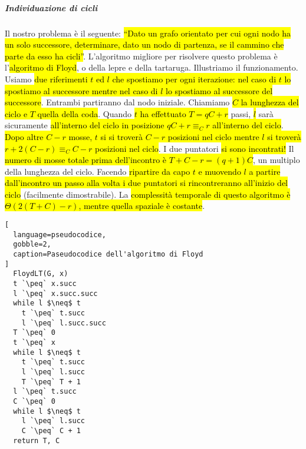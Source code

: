 \documentclass[a4paper,11pt,twoside]{article}
\theoremstyle{plain}
\theoremstyle{definition}
\theoremstyle{remark}
\newcommand{\peq}{$\gets$}
\begin{document}
\subparagraph{Individuazione di cicli} Il nostro problema è il seguente:
\hl{``Dato un grafo orientato per cui ogni nodo ha un solo successore,
determinare, dato un nodo di partenza, se il cammino che parte da esso ha
cicli''}. L'algoritmo migliore per risolvere questo problema è l'\hl{algoritmo
di Floyd}, o della lepre e della tartaruga. Illustriamo il funzionamento. Usiamo
\hl{due riferimenti $t$ ed $l$ che spostiamo per ogni iterazione: nel caso di
$t$ lo spostiamo al successore mentre nel caso di $l$ lo spostiamo al successore
del successore}. Entrambi partiranno dal nodo iniziale. Chiamiamo \hl{$C$ la
lunghezza del ciclo e $T$ quella della coda}. Quando \hl{$t$ ha effettuato $T =
qC + r$} passi, \hl{$l$} sarà sicuramente \hl{all'interno del ciclo in posizione
$qC + r \equiv_C r$ all'interno del ciclo}. \hl{Dopo altre $C-r$ mosse, $t$ si
si troverà $C-r$ posizioni nel ciclo mentre $l$ si troverà $r + 2(C-r) \equiv_C
C-r$ posizioni nel ciclo}. I due puntatori \hl{si sono incontrati!} Il
\hl{numero di mosse totale prima dell'incontro è $T+C-r=(q+1)C$}, un multiplo
della lunghezza del ciclo. Facendo \hl{ripartire da capo $t$ e muovendo $l$ a
partire dall'incontro un passo alla volta i due puntatori si rincontreranno
all'inizio del ciclo} (facilmente dimostrabile). La \hl{complessità temporale di
questo algoritmo è $\Theta(2(T+C)-r)$, mentre quella spaziale è costante}.

\begin{lstlisting}[
  language=pseudocodice,
  gobble=2,
  caption=Paseudocodice dell'algoritmo di Floyd
]
  FloydLT(G, x)
  t `\peq` x.succ
  l `\peq` x.succ.succ
  while l $\neq$ t
    t `\peq` t.succ
    l `\peq` l.succ.succ
  T `\peq` 0
  t `\peq` x
  while l $\neq$ t
    t `\peq` t.succ
    l `\peq` l.succ
    T `\peq` T + 1
  l `\peq` t.succ
  C `\peq` 0
  while l $\neq$ t
    l `\peq` l.succ
    C `\peq` C + 1
  return T, C
\end{lstlisting}

\appendix
\clearpage
\end{document}
